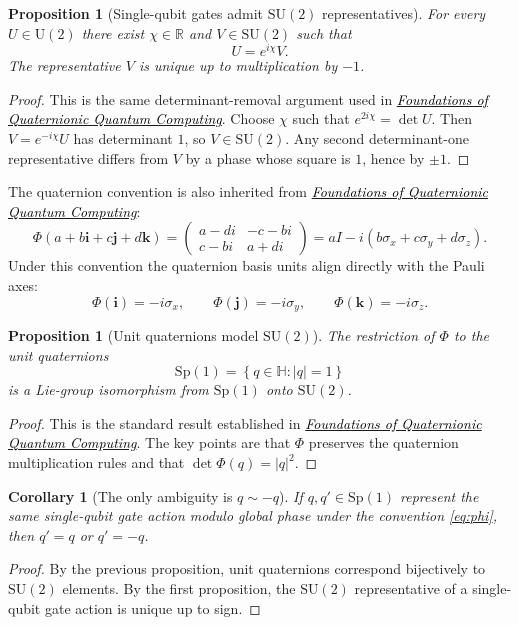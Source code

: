 \documentclass[11pt]{article}
\newtheorem{proposition}[definition]{Proposition}
\newtheorem{corollary}[definition]{Corollary}
\theoremstyle{remark}
\newcommand{\R}{\mathbb{R}}
\newcommand{\HH}{\mathbb{H}}
\newcommand{\SU}{\mathrm{SU}}
\newcommand{\U}{\mathrm{U}}
\newcommand{\Id}{I}
\newcommand{\ii}{\mathbf{i}}
\newcommand{\jj}{\mathbf{j}}
\newcommand{\kk}{\mathbf{k}}
\newcommand{\abs}[1]{\left\lvert #1 \right\rvert}
\newcommand{\set}[1]{\left\{ #1 \right\}}
\newcommand{\foundationstitle}{\href{../qqc-001-foundations/paper.pdf}{\textcolor{black}{\emph{Foundations of Quaternionic Quantum Computing}}}}
\begin{document}
\begin{proposition}[Single-qubit gates admit $\SU(2)$ representatives]
For every $U\in\U(2)$ there exist $\chi\in\R$ and $V\in\SU(2)$ such that
\[
U=e^{i\chi}V.
\]
The representative $V$ is unique up to multiplication by $-1$.
\end{proposition}

\begin{proof}
This is the same determinant-removal argument used in
\foundationstitle. Choose $\chi$ such that
$e^{2i\chi}=\det U$. Then $V=e^{-i\chi}U$ has determinant $1$, so $V\in\SU(2)$.
Any second determinant-one representative differs from $V$ by a phase whose
square is $1$, hence by $\pm 1$.
\end{proof}

The quaternion convention is also inherited from \foundationstitle:
\begin{equation}
\Phi(a+b\ii+c\jj+d\kk)=
\begin{pmatrix}
a-di & -c-bi \\
c-bi & a+di
\end{pmatrix}
=
a\Id-i(b\sigma_x+c\sigma_y+d\sigma_z).
\label{eq:phi}
\end{equation}
Under this convention the quaternion basis units align directly with the Pauli
axes:
\[
\Phi(\ii)=-i\sigma_x,\qquad \Phi(\jj)=-i\sigma_y,\qquad \Phi(\kk)=-i\sigma_z.
\]

\begin{proposition}[Unit quaternions model $\SU(2)$]
The restriction of $\Phi$ to the unit quaternions
\[
\mathrm{Sp}(1)=\set{q\in\HH:\abs{q}=1}
\]
is a Lie-group isomorphism from $\mathrm{Sp}(1)$ onto $\SU(2)$.
\end{proposition}

\begin{proof}
This is the standard result established in \foundationstitle. The key points are that
$\Phi$ preserves the quaternion multiplication rules and that
$\det \Phi(q)=\abs{q}^2$.
\end{proof}

\begin{corollary}[The only ambiguity is $q\sim -q$]
If $q,q'\in\mathrm{Sp}(1)$ represent the same single-qubit gate action modulo
global phase under the convention \eqref{eq:phi}, then $q'=q$ or $q'=-q$.
\end{corollary}

\begin{proof}
By the previous proposition, unit quaternions correspond bijectively to
$\SU(2)$ elements. By the first proposition, the $\SU(2)$ representative of a
single-qubit gate action is unique up to sign.
\end{proof}
\end{document}
